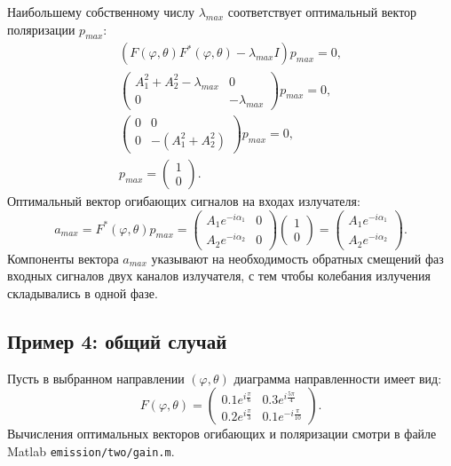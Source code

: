 Наибольшему собственному числу $\lambda_{max}$ соответствует оптимальный вектор поляризации $p_{max}$:
\begin{gather*}
    (F(\varphi, \theta)F^*(\varphi, \theta) - \lambda_{max} I) p_{max} = 0 , \\
    \begin{pmatrix}
        A_1^2 + A_2^2 - \lambda_{max} & 0               \\
        0                             & - \lambda_{max}
    \end{pmatrix}
    p_{max} = 0 , \\
    \begin{pmatrix}
        0 & 0                 \\
        0 & - (A_1^2 + A_2^2)
    \end{pmatrix}
    p_{max} = 0 , \\
    p_{max} = \begin{pmatrix}
        1 \\
        0
    \end{pmatrix} .
\end{gather*}
Оптимальный вектор огибающих сигналов на входах излучателя:
\[
    a_{max}
    = F^*(\varphi, \theta) p_{max}
    = \begin{pmatrix}
        A_1 e^{- i \alpha_1} & 0 \\
        A_2 e^{- i \alpha_2} & 0
    \end{pmatrix}
    \begin{pmatrix}
        1 \\
        0
    \end{pmatrix}
    = \begin{pmatrix}
        A_1 e^{- i \alpha_1} \\
        A_2 e^{- i \alpha_2}
    \end{pmatrix} .
\]
Компоненты вектора $a_{max}$ указывают на необходимость обратных смещений фаз входных сигналов двух каналов излучателя, с тем чтобы колебания излучения складывались в одной фазе.

\subsection{Пример 4: общий случай}

Пусть в выбранном направлении $(\varphi, \theta)$ диаграмма направленности имеет вид:
\[
    F(\varphi, \theta)
    =
    \begin{pmatrix}
        0.1 e^{i \frac{\pi}{6}} & 0.3 e^{i \frac{5 \pi}{4}}  \\
        0.2 e^{i \frac{\pi}{3}} & 0.1 e^{- i \frac{\pi}{10}}
    \end{pmatrix} .
\]
Вычисления оптимальных векторов огибающих и поляризации смотри в файле Matlab \texttt{emission/two/gain.m}.

